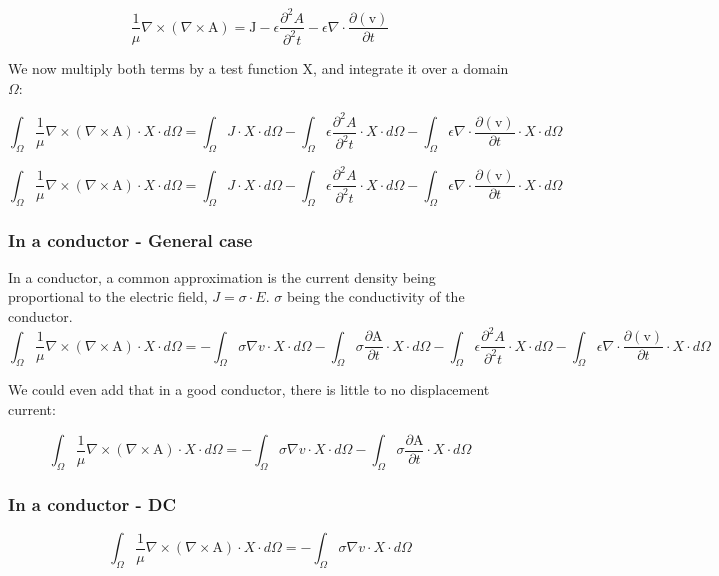\documentclass[10pt]{article}         %
\begin{document}
\[ \frac{1}{\mu}  \nabla \times ( \nabla \times \mathrm{A} ) =   \mathrm{ J }  - \epsilon \frac{ \partial ^2 A }{ \partial ^2 t } - \epsilon \nabla \cdot \frac{ \partial \left( \mathrm{v}  \right)
 }{ \partial t } \]

We now multiply both terms by a test function $\mathrm{X}$, and integrate it over a domain $\Omega$:

\[ \int_{\Omega} \frac{1}{\mu} \nabla \times ( \nabla \times \mathrm{A} ) \cdot X \cdot {d}\Omega =  \int_{\Omega} J \cdot X \cdot {d}\Omega - \int_{\Omega}   \epsilon \frac{ \partial ^2 A }{ \partial ^2 t } \cdot X \cdot {d}\Omega - \int_{\Omega} \epsilon \nabla \cdot \frac{ \partial \left( \mathrm{v}  \right)
}{ \partial t } \cdot X \cdot {d}\Omega  \]

\[ \int_{\Omega} \frac{1}{\mu} \nabla \times ( \nabla \times \mathrm{A} ) \cdot X \cdot {d}\Omega =  \int_{\Omega} J \cdot X \cdot {d}\Omega - \int_{\Omega}   \epsilon \frac{ \partial ^2 A }{ \partial ^2 t } \cdot X \cdot {d}\Omega - \int_{\Omega} \epsilon \nabla \cdot \frac{ \partial \left( \mathrm{v}  \right)
}{ \partial t } \cdot X \cdot {d}\Omega  \]

\subsubsection{In a conductor - General case}
In a conductor, a common approximation is the current density being proportional to the electric field, $ J = \sigma \cdot E $. $\sigma$ being the conductivity of the conductor.
\\
\[ \int_{\Omega} \frac{1}{\mu} \nabla \times ( \nabla \times \mathrm{A} ) \cdot X \cdot {d}\Omega =  - \int_{\Omega} \sigma \nabla v \cdot X \cdot {d}\Omega  - \int_{\Omega} \sigma  \frac{\partial  \mathrm{A}  }{ \partial t } \cdot X \cdot {d}\Omega - \int_{\Omega}   \epsilon \frac{ \partial ^2 A }{ \partial ^2 t } \cdot X \cdot {d}\Omega - \int_{\Omega} \epsilon \nabla \cdot \frac{ \partial \left( \mathrm{v}  \right)
}{ \partial t } \cdot X \cdot {d}\Omega  \]

We could even add that in a good conductor, there is little to no displacement current:

\[ \int_{\Omega} \frac{1}{\mu} \nabla \times ( \nabla \times \mathrm{A} ) \cdot X \cdot {d}\Omega =  - \int_{\Omega} \sigma \nabla v \cdot X \cdot {d}\Omega  - \int_{\Omega} \sigma  \frac{\partial  \mathrm{A}  }{ \partial t } \cdot X \cdot {d}\Omega \]
\subsubsection{In a conductor - DC}
\[ \int_{\Omega} \frac{1}{\mu} \nabla \times ( \nabla \times \mathrm{A} ) \cdot X \cdot {d}\Omega =  - \int_{\Omega} \sigma \nabla v \cdot X \cdot {d}\Omega    \]
\end{document}
